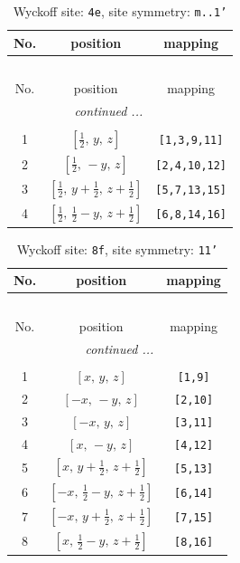 \documentclass[fleqn,8pt]{jsarticle}
\begin{document}
\renewcommand{\arraystretch}{1.2}
\begin{longtable}{ccc}
\caption{Wyckoff site: {\tt 4e}, site symmetry: {\tt m..1'}}
 \\
 \hline \hline
No. & position & mapping \\ \hline \endfirsthead

\multicolumn{2}{l}{\tablename\ \thetable{}} \\
 \hline \hline
No. & position & mapping \\ \hline \endhead

 \hline \hline
\multicolumn{2}{r}{\footnotesize\it continued ...} \\ \endfoot

 \hline \hline
\multicolumn{2}{r}{} \\ \endlastfoot

1 & $\left[ \frac{1}{2},\, y,\, z \right]$ & {\tt [1,3,9,11]} \\ \hline
2 & $\left[ \frac{1}{2},\, - y,\, z \right]$ & {\tt [2,4,10,12]} \\ \hline
3 & $\left[ \frac{1}{2},\, y + \frac{1}{2},\, z + \frac{1}{2} \right]$ & {\tt [5,7,13,15]} \\ \hline
4 & $\left[ \frac{1}{2},\, \frac{1}{2} - y,\, z + \frac{1}{2} \right]$ & {\tt [6,8,14,16]} \\
\end{longtable}
\renewcommand{\arraystretch}{1.2}
\begin{longtable}{ccc}
\caption{Wyckoff site: {\tt 8f}, site symmetry: {\tt 11'}}
 \\
 \hline \hline
No. & position & mapping \\ \hline \endfirsthead

\multicolumn{2}{l}{\tablename\ \thetable{}} \\
 \hline \hline
No. & position & mapping \\ \hline \endhead

 \hline \hline
\multicolumn{2}{r}{\footnotesize\it continued ...} \\ \endfoot

 \hline \hline
\multicolumn{2}{r}{} \\ \endlastfoot

1 & $\left[ x,\, y,\, z \right]$ & {\tt [1,9]} \\ \hline
2 & $\left[ - x,\, - y,\, z \right]$ & {\tt [2,10]} \\ \hline
3 & $\left[ - x,\, y,\, z \right]$ & {\tt [3,11]} \\ \hline
4 & $\left[ x,\, - y,\, z \right]$ & {\tt [4,12]} \\ \hline
5 & $\left[ x,\, y + \frac{1}{2},\, z + \frac{1}{2} \right]$ & {\tt [5,13]} \\ \hline
6 & $\left[ - x,\, \frac{1}{2} - y,\, z + \frac{1}{2} \right]$ & {\tt [6,14]} \\ \hline
7 & $\left[ - x,\, y + \frac{1}{2},\, z + \frac{1}{2} \right]$ & {\tt [7,15]} \\ \hline
8 & $\left[ x,\, \frac{1}{2} - y,\, z + \frac{1}{2} \right]$ & {\tt [8,16]} \\
\end{longtable}
\end{document}

